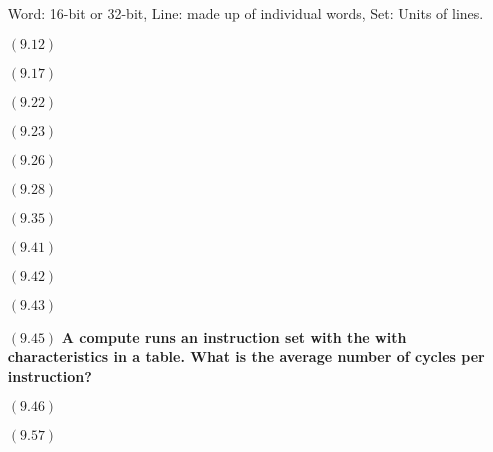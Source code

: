 \documentclass[letterpaper,10pt,titlepage]{article}
\begin{document}
\begin{enumerate}
Word: 16-bit or 32-bit, Line: made up of individual words, Set: Units of lines.

\item[$(9.12)$] \textbf{}

\item[$(9.17)$] \textbf{}
	
\item[$(9.22)$] \textbf{}

\item[$(9.23)$] \textbf{}

\item[$(9.26)$] \textbf{}

\item[$(9.28)$] \textbf{}

\item[$(9.35)$] \textbf{}

\item[$(9.41)$] \textbf{}

\item[$(9.42)$] \textbf{}

\item[$(9.43)$] \textbf{}

\item[$(9.45)$] \textbf{A compute runs an instruction set with the with characteristics in a table. What is the average number of cycles per instruction?}

\item[$(9.46)$] \textbf{}

\item[$(9.57)$] \textbf{}

\end{enumerate}
\end{document}
